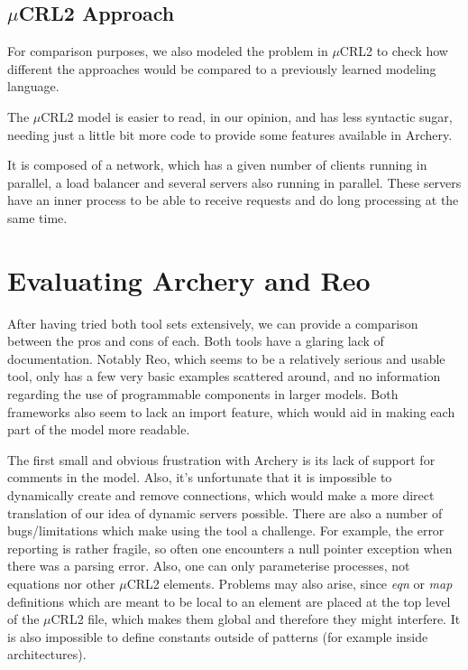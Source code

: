 \documentclass[a4paper]{article}
\newcommand{\ar}{Archery\xspace}
\newcommand{\re}{Reo\xspace}
\newcommand{\mcrl}{$\mu$CRL2\xspace}
\begin{document}
\subsection{\mcrl Approach}
For comparison purposes, we also modeled the problem in \mcrl to check how
different the approaches would be compared to a previously learned modeling language.

The \mcrl model is easier to read, in our opinion, and has less syntactic
sugar, needing just a little bit more code to provide some features
available in \ar.

It is composed of a network, which has a given number of clients running in
parallel, a load balancer and several servers also running in parallel. These
servers have an inner process to be able to receive requests and do long
processing at the same time.


%
%
\section{Evaluating \ar and \re}


After having tried both tool sets extensively, we can provide a comparison between
the pros and cons of each. Both tools have a glaring lack of documentation.
Notably \re, which seems to be a relatively serious and usable tool, only has a
few very basic examples scattered around, and no information regarding the use
of
programmable components in larger models. Both frameworks also seem to lack an
import feature, which would aid in making each part of the model more readable.

The first small and obvious frustration with \ar is its lack of support for
comments in the model. Also, it's unfortunate that it is impossible to
dynamically create and remove connections, which would make a more direct
translation of our idea of dynamic servers possible. There are also a number of
bugs/limitations which make using the tool a challenge. For example, the error
reporting is rather fragile, so often one encounters a null pointer exception when there was a
parsing error. Also, one can only parameterise processes, not equations nor
other \mcrl elements. Problems may also arise, since \textit{eqn} or
\textit{map} definitions which are meant to be local to an element are placed at
the top level of the \mcrl file, which makes them global and therefore they
might interfere. It is also impossible to define constants outside of patterns
(for example inside architectures).
\end{document}
